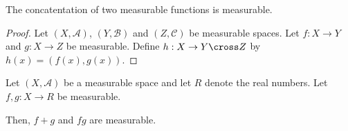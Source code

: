 \begin{prop}
  The concatentation of
  two measurable functions
  is measurable.
  \begin{proof}
Let
$(X, \mathcal{A})$,
$(Y, \mathcal{B})$
and
$(Z, \mathcal{C})$
be measurable spaces.
Let
$f: X \to Y$
and
$g: X \to Z$
be measurable.
Define
$h: X \to Y \cross Z$
by $h(x) = (f(x), g(x))$.
  \end{proof}
\end{prop}

\begin{prop}
Let $(X, \mathcal{A})$
be a measurable space
and let $R$ denote the
real numbers.
Let
$f,g: X \to R$
be measurable.

Then, $f+g$ and $fg$ are measurable.
\end{prop}
\strats
